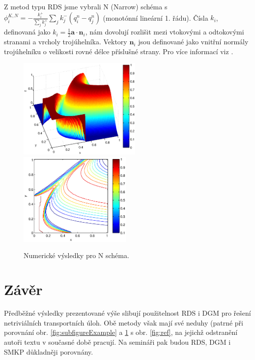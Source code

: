\documentclass{sna}
\begin{document}
Z metod typu RDS jsme vybrali N (Narrow) schéma s \mbox{$\phi_i^{K,N}=-\frac{k_i^+}{\sum_jk_j^+}\sum_jk_j^-(q_i^n-q_j^n)$} (monotónní lineární 1. řádu).
Čísla $k_i$, definovaná jako $k_i=\frac{1}{2}\mathbf{a}\cdot\mathbf{n}_i$, nám dovolují rozlišit mezi vtokovými a odtokovými stranami a vrcholy trojúhelníka. Vektory $\mathbf{n}_i$ jsou definované jako vnitřní normály trojúhelníku o velikosti rovné délce příslušné strany. Pro více informací viz \cite{Deconinck-2003-IRD}.

\begin{figure}[h]
  \begin{center}
    \includegraphics[width=6cm]{N_surf.eps}\hspace{2em}
    \includegraphics[width=5.5cm]{N_cont.eps}
  \caption{Numerické výsledky pro N schéma.}
  \label{fig:rds}
  \end{center}
  \end{figure}
  
\section{Závěr}
Předběžné výsledky prezentované výše slibují použitelnost RDS i DGM pro řešení netriviálních transportních úloh. Obě metody však mají své neduhy (patrné při porovnání obr. \ref{fig:subfigureExample} a \ref{fig:rds} s obr. \ref{fig:ref}, na jejichž odstranění autoři textu v současné době pracují. Na semináři pak budou RDS, DGM i SMKP důkladněji porovnány.
\end{document}
